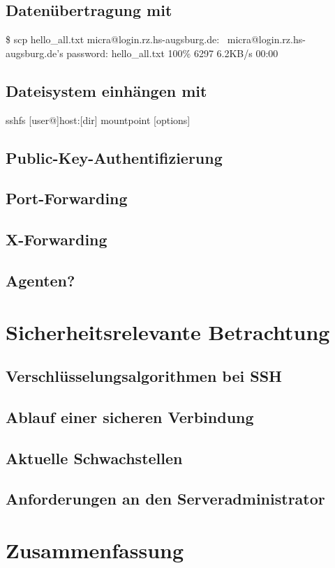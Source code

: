 \documentclass[ngerman,pdf]{wkcms}    %
\begin{document}
\subsection{Datenübertragung mit }

\begin{program}
\$ scp hello\_all.txt
micra@login.rz.hs-augsburg.de:~
micra@login.rz.hs-augsburg.de's password:
hello\_all.txt        100\% 6297     6.2KB/s   00:00
\end{program}

\subsection{Dateisystem einhängen mit }

\begin{program}
sshfs [user@]host:[dir] mountpoint [options]
\end{program}

\subsection{Public-Key-Authentifizierung}
\subsection{Port-Forwarding}
\subsection{X-Forwarding}
\subsection{Agenten?}


\section{Sicherheitsrelevante Betrachtung}
\subsection{Verschlüsselungsalgorithmen bei SSH}
\subsection{Ablauf einer sicheren Verbindung}\label{sec:ablauf}
\subsection{Aktuelle Schwachstellen}
\subsection{Anforderungen an den Serveradministrator}


\newpage


\section{Zusammenfassung}




\end{document}
